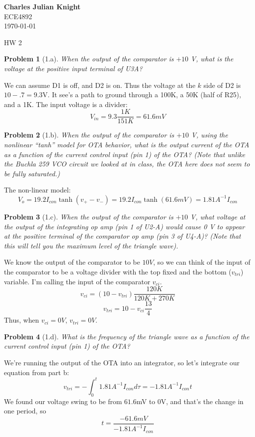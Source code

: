 \documentclass[12pt]{article}
\newtheorem*{prob}{Problem}
\begin{document}
\begin{flushright}
\textbf{Charles Julian Knight}\\
ECE4892\\
\today
\end{flushright}


\begin{center}
\huge HW 2
\end{center}

\begin{prob}[1.a]{
When the output of the comparator is $+10$ V, what is the voltage at the positive input terminal of U3A?
}\end{prob}
We can assume D1 is off, and D2 is on. Thus the voltage at the $k$ side of D2 is $10-.7=9.3$V. It see's a path to ground through a 100K, a 50K (half of R25), and a 1K. The input voltage is a divider:
\[ V_{in} = 9.3 \frac{1K}{151K} = 61.6 mV \]

\begin{prob}[1.b]{
When the output of the comparator is $+10$ V, using the nonlinear ``tanh'' model for OTA behavior, what is the output current of the OTA as a function of the current control input (pin 1) of the OTA? (Note that unlike the Buchla 259 VCO circuit we looked at in class, the OTA here does not seem to be fully saturated.)
}\end{prob}
The non-linear model:
\[ V_o = 19.2 I_{con} \tanh(v_+ - v_-) = 19.2 I_{con} \tanh(61.6mV) = 1.81 A^{-1}I_{con} \]

\begin{prob}[1.c]{
When the output of the comparator is $+10$ V, what voltage at the output of the integrating op amp (pin 1 of U2-A) would cause 0 V to appear at the positive terminal of the comparator op amp (pin 3 of U4-A)? (Note that this will tell you the maximum level of the triangle wave).
}\end{prob}
We know the output of the comparator to be $10V$, so we can think of the input of the comparator to be a voltage divider with the top fixed and the bottom ($v_{tri}$) variable. I'm calling the input of the comparator $v_{ci}$.
\[ v_{ci} = (10-v_{tri})\frac{120K}{120K+270K} \]
\[ v_{tri} = 10 - v_{ci}\frac{13}{4} \]
Thus, when $v_{ci}=0V$, $v_{tri}=0V$.

\begin{prob}[1.d]{
What is the frequency of the triangle wave as a function of the current control input (pin 1) of the OTA?
}\end{prob}
We're running the output of the OTA into an integrator, so let's integrate our equation from part b:
\[v_{tri} = -\int_0^t 1.81 A^{-1}I_{con} d \tau  = -1.81 A^{-1}I_{con} t \]
We found our voltage swing to be from $61.6$mV to $0$V, and that's the change in one period, so
\[ t = \frac{-61.6mV}{-1.81 A^{-1}I_{con}}\]
\end{document}
